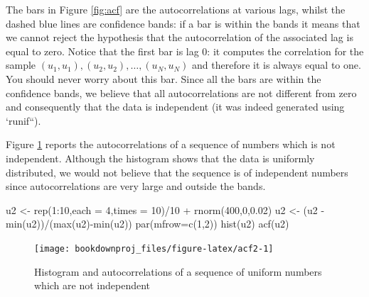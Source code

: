 \documentclass[
]{book}
\newenvironment{Shaded}{\begin{snugshade}}{\end{snugshade}}
\newcommand{\AttributeTok}[1]{\textcolor[rgb]{0.77,0.63,0.00}{#1}}
\newcommand{\DecValTok}[1]{\textcolor[rgb]{0.00,0.00,0.81}{#1}}
\newcommand{\FloatTok}[1]{\textcolor[rgb]{0.00,0.00,0.81}{#1}}
\newcommand{\FunctionTok}[1]{\textcolor[rgb]{0.00,0.00,0.00}{#1}}
\newcommand{\NormalTok}[1]{#1}
\newcommand{\OtherTok}[1]{\textcolor[rgb]{0.56,0.35,0.01}{#1}}
\newcommand{\SpecialCharTok}[1]{\textcolor[rgb]{0.00,0.00,0.00}{#1}}
\begin{document}
The bars in Figure \ref{fig:acf} are the autocorrelations at various lags, whilst the dashed blue lines are confidence bands: if a bar is within the bands it means that we cannot reject the hypothesis that the autocorrelation of the associated lag is equal to zero. Notice that the first bar is lag 0: it computes the correlation for the sample \((u_1,u_1),(u_2,u_2),\dots,(u_N,u_N)\) and therefore it is always equal to one. You should never worry about this bar. Since all the bars are within the confidence bands, we believe that all autocorrelations are not different from zero and consequently that the data is independent (it was indeed generated using `runif``).

Figure \ref{fig:acf2} reports the autocorrelations of a sequence of numbers which is not independent. Although the histogram shows that the data is uniformly distributed, we would not believe that the sequence is of independent numbers since autocorrelations are very large and outside the bands.

\begin{Shaded}
\begin{Highlighting}[]
\NormalTok{u2 }\OtherTok{\textless{}{-}} \FunctionTok{rep}\NormalTok{(}\DecValTok{1}\SpecialCharTok{:}\DecValTok{10}\NormalTok{,}\AttributeTok{each =} \DecValTok{4}\NormalTok{,}\AttributeTok{times =} \DecValTok{10}\NormalTok{)}\SpecialCharTok{/}\DecValTok{10} \SpecialCharTok{+} \FunctionTok{rnorm}\NormalTok{(}\DecValTok{400}\NormalTok{,}\DecValTok{0}\NormalTok{,}\FloatTok{0.02}\NormalTok{) }
\NormalTok{u2 }\OtherTok{\textless{}{-}}\NormalTok{ (u2 }\SpecialCharTok{{-}} \FunctionTok{min}\NormalTok{(u2))}\SpecialCharTok{/}\NormalTok{(}\FunctionTok{max}\NormalTok{(u2)}\SpecialCharTok{{-}}\FunctionTok{min}\NormalTok{(u2))}
\FunctionTok{par}\NormalTok{(}\AttributeTok{mfrow=}\FunctionTok{c}\NormalTok{(}\DecValTok{1}\NormalTok{,}\DecValTok{2}\NormalTok{))}
\FunctionTok{hist}\NormalTok{(u2)}
\FunctionTok{acf}\NormalTok{(u2)}
\end{Highlighting}
\end{Shaded}

\begin{figure}

{\centering \texttt{[image: bookdownproj\_files/figure-latex/acf2-1]} 

}

\caption{Histogram and autocorrelations of a sequence of uniform numbers which are not independent}\label{fig:acf2}
\end{figure}
\end{document}
